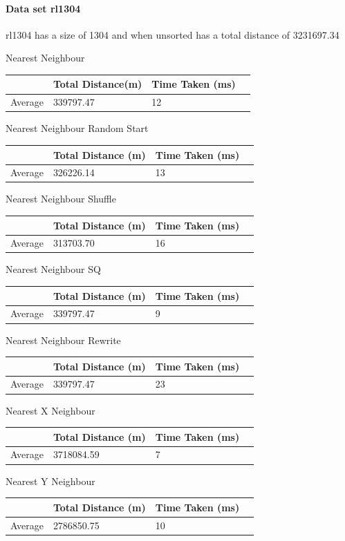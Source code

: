 \documentclass[conference,backref=page]{acmsiggraph}
\begin{document}
\paragraph{Data set rl1304} \hfill

rl1304 has a size of 1304 and when unsorted has a total distance of 3231697.34
																				
\begin{center}	
	
	Nearest Neighbour
	\begin{tabular}{| l | l | l | l |}
		\hline
		& Total Distance(m)& Time Taken (ms)\\ \hline
		Average & 339797.47 & 12 \\ \hline
	\end{tabular}
	
	Nearest Neighbour Random Start
	\begin{tabular}{| l | l | l | l |}
		\hline
		& Total Distance (m) & Time Taken (ms)\\ \hline
		Average & 326226.14 & 13 \\ \hline
	\end{tabular}
	
	Nearest Neighbour Shuffle
	\begin{tabular}{| l | l | l | l |}
		\hline
		& Total Distance (m) & Time Taken (ms)\\ \hline
		Average & 313703.70 & 16 \\ \hline
	\end{tabular}
	
	Nearest Neighbour SQ
	\begin{tabular}{| l | l | l | l |}
		\hline
		& Total Distance (m) & Time Taken (ms)\\ \hline
		Average & 339797.47 & 9 \\ \hline
	\end{tabular}
	
	Nearest Neighbour Rewrite
	\begin{tabular}{| l | l | l | l |}
		\hline
		& Total Distance (m) & Time Taken (ms)\\ \hline
		Average & 339797.47 & 23 \\ \hline
	\end{tabular}
	
	
	Nearest X Neighbour	
	\begin{tabular}{| l | l | l | l |}
		\hline
		& Total Distance (m) & Time Taken (ms)\\ \hline
		Average & 3718084.59 & 7 \\ \hline	
	\end{tabular}
	
	Nearest Y Neighbour	
	\begin{tabular}{| l | l | l | l |}
		\hline
		& Total Distance (m) & Time Taken (ms)\\ \hline
		Average & 2786850.75 & 10 \\ \hline
	\end{tabular}
\end{center}
\end{document}
